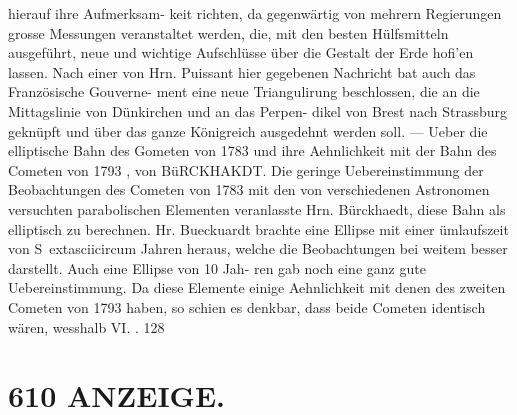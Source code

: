 \documentclass[12pt,a4paper]{article}
\begin{document}
{{{{{{{{hierauf  ihre  Aufmerksam- keit richten,  da  gegenwärtig  von  mehrern  Regierungen  grosse  Messungen  veranstaltet  werden,  die,  mit den  besten  Hülfsmitteln  ausgeführt,    neue   und  wichtige  Aufschlüsse    über  die  Gestalt    der  Erde    hofi'en lassen.    Nach  einer  von  Hrn.  Puissant   hier  gegebenen  Nachricht  bat  auch    das  Französische  Gouverne- ment eine  neue  Triangulirung  beschlossen,  die  an  die  Mittagslinie  von  Dünkirchen  und  an  das  Perpen- dikel von  Brest   nach  Strassburg   geknüpft  und   über  das  ganze  Königreich  ausgedehnt  werden  soll.  --- Ueber  die  elliptische  Bahn  des  Gometen  von  1783  und  ihre  Aehnlichkeit  mit  der  Bahn  des  Cometen  von 1793 ,  von  BüRCKHAKDT.     Die  geringe  Uebereinstimmung   der  Beobachtungen   des  Cometen  von    1783  mit den  von   verschiedenen    Astronomen   versuchten  parabolischen  Elementen   veranlasste   Hrn.  Bürckhaedt, diese  Bahn  als  elliptisch  zu  berechnen.     Hr.  Bueckuardt  brachte  eine  Ellipse  mit  einer  ümlaufszeit  von S\	extasciicircum{}{ }  Jahren  heraus,  welche  die  Beobachtungen  bei  weitem  besser  darstellt.     Auch  eine  Ellipse  von  10  Jah- ren gab  noch  eine  ganz  gute  Uebereinstimmung.    Da  diese  Elemente  einige  Aehnlichkeit  mit  denen  des zweiten  Cometen  von  1793  haben,  so  schien  es  denkbar,  dass  beide  Cometen  identisch  wären,  wesshalb VI.  .  128


\section*{610  ANZEIGE.}

}}}}}}}}
\end{document}
